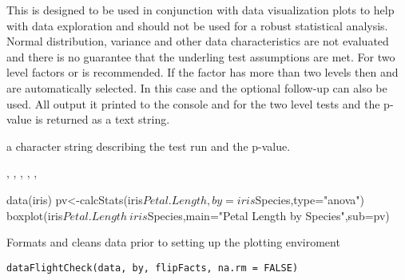 \documentclass[a4paper]{book}
\begin{document}
%
\begin{Details}\relax
This is designed to be used in conjunction with data visualization plots to help with data exploration and should not be used for a robust statistical analysis. Normal distribution, variance and other data characteristics are not evaluated and there is no guarantee that the underling test assumptions are met. For two level factors  or  is recommended. If the factor has more than two levels then  and  are automatically selected. In this case  and the optional follow-up  can also be used. All output it printed to the console and for the two level tests and  the p-value is returned as a text string.
\end{Details}
%
\begin{Value}
a character string describing the test run and the p-value.
\end{Value}
%
\begin{SeeAlso}\relax
{}, , , , , 
\end{SeeAlso}
%
\begin{Examples}
\begin{ExampleCode}
data(iris)
pv<-calcStats(iris$Petal.Length,by=iris$Species,type="anova")
boxplot(iris$Petal.Length~iris$Species,main="Petal Length by Species",sub=pv)

\end{ExampleCode}
\end{Examples}
%
\begin{Description}\relax
Formats and cleans data prior to setting up the plotting enviroment
\end{Description}
%
\begin{Usage}
\begin{verbatim}
dataFlightCheck(data, by, flipFacts, na.rm = FALSE)
\end{verbatim}
\end{Usage}
%
\end{document}

